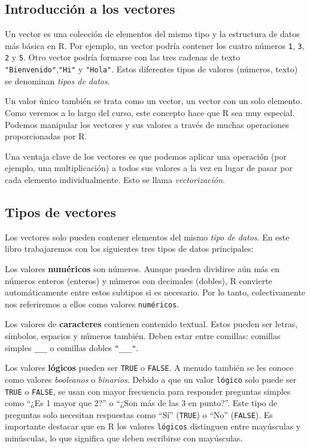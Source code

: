 \documentclass[
]{book}
\begin{document}
\hypertarget{introducciuxf3n-a-los-vectores}{%
\subsection{Introducción a los vectores}\label{introducciuxf3n-a-los-vectores}}

Un vector es una colección de elementos del mismo tipo y la estructura de datos más básica en R. Por ejemplo, un vector podría contener los cuatro números \texttt{1}, \texttt{3}, \texttt{2} y \texttt{5}. Otro vector podría formarse con las tres cadenas de texto \texttt{"Bienvenido"},\texttt{"Hi"} y \texttt{"Hola"}. Estos diferentes tipos de valores (números, texto) se denominan \emph{tipos de datos}.

Un valor único también se trata como un vector, un vector con un solo elemento. Como veremos a lo largo del curso, este concepto hace que R sea muy especial. Podemos manipular los vectores y sus valores a través de muchas operaciones proporcionadas por R.

Una ventaja clave de los vectores es que podemos aplicar una operación (por ejemplo, una multiplicación) a todos sus valores a la vez en lugar de pasar por cada elemento individualmente. Esto se llama \emph{vectorización}.

\hypertarget{tipos-de-vectores}{%
\subsection{Tipos de vectores}\label{tipos-de-vectores}}

Los vectores solo pueden contener elementos del mismo \emph{tipo de datos}. En este libro trabajaremos con los siguientes tres tipos de datos principales:

Los valores \textbf{numéricos} son números. Aunque pueden dividirse aún más en números enteros (enteros) y números con decimales (dobles), R convierte automáticamente entre estos subtipos si es necesario. Por lo tanto, colectivamente nos referiremos a ellos como valores \texttt{numéricos}.

Los valores de \textbf{caracteres} contienen contenido textual. Estos pueden ser letras, símbolos, espacios y números también. Deben estar entre comillas: comillas simples \texttt{\textquotesingle{}\_\_\_\textquotesingle{}} o comillas dobles \texttt{"\_\_\_"}.

Los valores \textbf{lógicos} pueden ser \texttt{TRUE} o \texttt{FALSE}. A menudo también se les conoce como valores \emph{booleanos} o \emph{binarios}. Debido a que un valor \texttt{lógico} solo puede ser \texttt{TRUE} o \texttt{FALSE}, se usan con mayor frecuencia para responder preguntas simples como ``¿Es 1 mayor que 2?'' o ``¿Son más de las 3 en punto?''. Este tipo de preguntas solo necesitan respuestas como ``Sí'' (\texttt{TRUE}) o ``No'' (\texttt{FALSE}). Es importante destacar que en R los valores \texttt{lógicos} distinguen entre mayúsculas y minúsculas, lo que significa que deben escribirse con mayúsculas.
\end{document}
